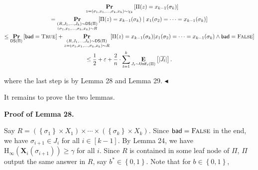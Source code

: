 \documentclass[10pt,a4paper]{article}
\begin{document}
\[\begin{gathered}
\displaystyle\quad\operatorname*{\mathbf{Pr}}_{z=(\sigma_{1},x_{1},\dots,\sigma_{k},x_{k})\sim\chi_{k}}\left[\Pi(z)=x_{k-1}(\sigma_{k})\right] \\
\displaystyle=\operatorname*{\mathbf{Pr}}_{\begin{subarray}{c}(R,J_{1},\dots,J_{k})\sim\mathsf{DS}(\Pi)\\
(\sigma_{1},x_{1},\dots,\sigma_{k},x_{k})\sim R\end{subarray}}\left[\Pi(z)=x_{k-1}(\sigma_{k})\;\middle|\;x_{1}(\sigma_{2})=\cdots=x_{k-1}(\sigma_{k})\right] \\
\displaystyle\leq\operatorname*{\mathbf{Pr}}_{\mathsf{DS}(\Pi)}\left[\mathsf{bad}=\textsc{True}\right]+\operatorname*{\mathbf{Pr}}_{\begin{subarray}{c}(R,J_{1},\dots,J_{k})\sim\mathsf{DS}(\Pi)\\
z=(\sigma_{1},x_{1},\dots,\sigma_{k},x_{k})\sim R\end{subarray}}\left[\Pi(z)=x_{k-1}(\sigma_{k})|x_{1}(\sigma_{2})=\cdots=x_{k-1}(\sigma_{k})\land\mathsf{bad}=\textsc{False}\right] \\
\displaystyle\leq\frac{1}{2}+\varepsilon+\frac{2}{n}\cdot\sum_{t=1}^{k}\operatorname*{\mathbf{E}}_{J_{t}\sim\mathsf{Unif}_{t}(\Pi)}\left[|\overline{J_{t}}|\right].
\end{gathered}\]


where the last step is by Lemma 28 and Lemma 29.
$\blacktriangleleft$\par




It remains to prove the two lemmas.\par





\par\medskip\noindent\textbf{Proof of Lemma 28.}\par




Say $R=(\left\{\sigma_{1}\right\}\times X_{1})\times\cdots\times(\left\{\sigma_{k}\right\}\times X_{k})$.
Since $\mathsf{bad}=\textsc{False}$ in the end,
we have $\sigma_{i+1}\in J_{i}$ for all $i\in[k-1]$.
By Lemma 24, we have $\text{H}_{\infty}(\bm{X}_{i}(\sigma_{i+1}))\geq\gamma$ for all $i$.
Since $R$ is contained in some leaf node of $\Pi$,
$\Pi$ output the same answer in $R$, say $b^{*}\in\left\{0,1\right\}$.
Note that for $b\in\left\{0,1\right\}$,\par
\end{document}
